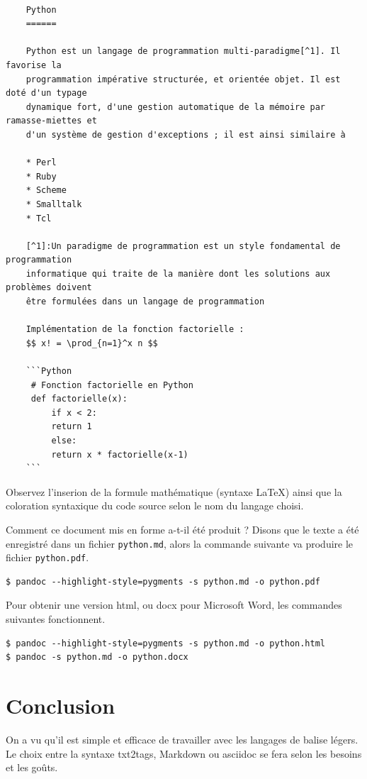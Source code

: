 \documentclass[12pt]{article}
\begin{document}
\begin{verbatim}

    Python
    ======

    Python est un langage de programmation multi-paradigme[^1]. Il favorise la
    programmation impérative structurée, et orientée objet. Il est doté d'un typage
    dynamique fort, d'une gestion automatique de la mémoire par ramasse-miettes et
    d'un système de gestion d'exceptions ; il est ainsi similaire à 

    * Perl
    * Ruby
    * Scheme
    * Smalltalk
    * Tcl

    [^1]:Un paradigme de programmation est un style fondamental de programmation
    informatique qui traite de la manière dont les solutions aux problèmes doivent
    être formulées dans un langage de programmation

    Implémentation de la fonction factorielle :
    $$ x! = \prod_{n=1}^x n $$

    ```Python
     # Fonction factorielle en Python
     def factorielle(x):
         if x < 2:
         return 1
         else:
         return x * factorielle(x-1)
    ```
\end{verbatim}
Observez l'inserion de la formule mathématique (syntaxe LaTeX) ainsi que
la coloration syntaxique du code source selon le nom du langage choisi.

Comment ce document mis en forme a-t-il été produit ? Disons que le
texte a été enregistré dans un fichier \texttt{python.md}, alors la
commande suivante va produire le fichier \texttt{python.pdf}.

\begin{verbatim}
$ pandoc --highlight-style=pygments -s python.md -o python.pdf
\end{verbatim}
Pour obtenir une version html, ou docx pour Microsoft Word, les
commandes suivantes fonctionnent.

\begin{verbatim}
$ pandoc --highlight-style=pygments -s python.md -o python.html
$ pandoc -s python.md -o python.docx
\end{verbatim}
\section{Conclusion}

On a vu qu'il est simple et efficace de travailler avec les langages de
balise légers. Le choix entre la syntaxe txt2tags, Markdown ou asciidoc
se fera selon les besoins et les goûts.
\end{document}
